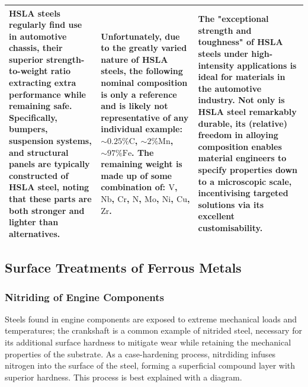 \documentclass[../main.tex]{subfiles}
\begin{document}
\begin{table}[h!]
\begin{center}
\begin{tabularx}{\textwidth}{
				| >{\RaggedRight\arraybackslash}X
				| >{\Centering\arraybackslash}X
				| >{\RaggedRight\arraybackslash}X |}
			\hline
			HSLA steels regularly find use in automotive chassis, their superior strength-to-weight ratio extracting extra performance while remaining safe. \parencite{hslaprosconsapp} Specifically, bumpers, suspension systems, and structural panels are typically constructed of HSLA steel, noting that these parts are both stronger and lighter than alternatives.                                                                                                      &
			Unfortunately, due to the greatly varied nature of HSLA steels, the following nominal composition is only a reference and is likely not representative of any individual example: $\sim0.25\%\mathrm{C}$, $\sim2\%\mathrm{Mn}$, \hskip 3cm $\sim97\%\mathrm{Fe}$. The remaining weight is made up of some combination of: $\mathrm{V}$, $\mathrm{Nb}$, $\mathrm{Cr}$, $\mathrm{N}$, $\mathrm{Mo}$, $\mathrm{Ni}$, $\mathrm{Cu}$, $\mathrm{Zr}$. \parencite{hslacomp} &
			The "exceptional strength and toughness" of HSLA steels under high-intensity applications is ideal for materials in the automotive industry. \parencite{hslaprosconsapp} Not only is HSLA steel remarkably durable, its (relative) freedom in alloying composition enables material engineers to specify properties down to a microscopic scale, incentivising targeted solutions via its excellent customisability.                                                                                                             \\
			\hline
		\end{tabularx}
	\end{center}
\end{table}
\newpage

\subsection{Surface Treatments of Ferrous Metals}
\subsubsection{Nitriding of Engine Components} %
Steels found in engine components are exposed to extreme mechanical loads and temperatures; the crankshaft is a common example of nitrided steel, necessary for its additional surface hardness to mitigate wear while retaining the mechanical properties of the substrate.
As a case-hardening process, nitrdiding infuses nitrogen into the surface of the steel, forming a superficial compound layer with superior hardness. \parencite{nitriding2}
This process is best explained with a diagram.
\end{document}
